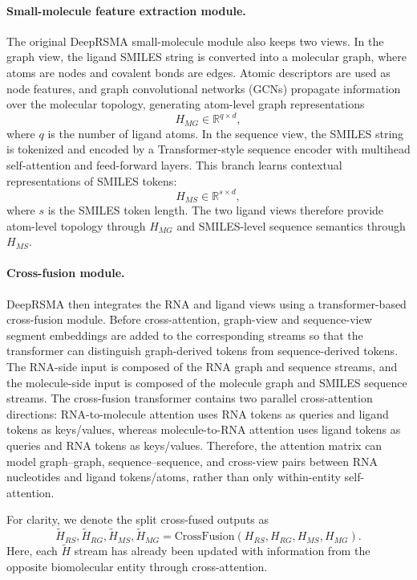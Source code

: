 ﻿\documentclass[journal=jcisd8,manuscript=article]{achemso}
\begin{document}
\paragraph{Small-molecule feature extraction module.}
The original DeepRSMA small-molecule module also keeps two views. In the graph view, the ligand SMILES string is converted into a molecular graph, where atoms are nodes and covalent bonds are edges. Atomic descriptors are used as node features, and graph convolutional networks (GCNs) propagate information over the molecular topology,\cite{Kipf2017GCN} generating atom-level graph representations
\begin{equation}
H_{MG} \in \mathbb{R}^{q \times d},
\end{equation}
where $q$ is the number of ligand atoms. In the sequence view, the SMILES string is tokenized and encoded by a Transformer-style sequence encoder with multihead self-attention and feed-forward layers.\cite{Vaswani2017Attention} This branch learns contextual representations of SMILES tokens:
\begin{equation}
H_{MS} \in \mathbb{R}^{s \times d},
\end{equation}
where $s$ is the SMILES token length. The two ligand views therefore provide atom-level topology through $H_{MG}$ and SMILES-level sequence semantics through $H_{MS}$.

\paragraph{Cross-fusion module.}
DeepRSMA then integrates the RNA and ligand views using a transformer-based cross-fusion module. Before cross-attention, graph-view and sequence-view segment embeddings are added to the corresponding streams so that the transformer can distinguish graph-derived tokens from sequence-derived tokens. The RNA-side input is composed of the RNA graph and sequence streams, and the molecule-side input is composed of the molecule graph and SMILES sequence streams. The cross-fusion transformer contains two parallel cross-attention directions: RNA-to-molecule attention uses RNA tokens as queries and ligand tokens as keys/values, whereas molecule-to-RNA attention uses ligand tokens as queries and RNA tokens as keys/values. Therefore, the attention matrix can model graph--graph, sequence--sequence, and cross-view pairs between RNA nucleotides and ligand tokens/atoms, rather than only within-entity self-attention.

For clarity, we denote the split cross-fused outputs as
\begin{equation}
\tilde{H}_{RS},\tilde{H}_{RG},\tilde{H}_{MS},\tilde{H}_{MG} =
\mathrm{CrossFusion}(H_{RS},H_{RG},H_{MS},H_{MG}).
\end{equation}
Here, each $\tilde{H}$ stream has already been updated with information from the opposite biomolecular entity through cross-attention.
\end{document}
